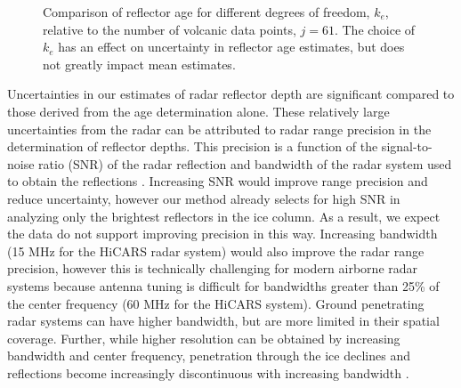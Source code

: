 \begin{figure*}[ht]
\begin{center}
{}
\caption{Comparison of reflector age for different degrees of freedom, $k_e$, relative to the number of volcanic data points, $j=61$. The choice of $k_e$ has an effect on uncertainty in reflector age estimates, but does not greatly impact mean estimates. }
\end{center}
\label{fig:ke}
\end{figure*}


Uncertainties in our estimates of radar reflector depth are significant compared to those derived from the age determination alone. These relatively large uncertainties from the radar can be attributed to radar range precision in the determination of reflector depths. This precision is a function of the signal-to-noise ratio (SNR) of the radar reflection and bandwidth of the radar system used to obtain the reflections \citep{cavitte2016}. Increasing SNR would improve range precision and reduce uncertainty, however our method already selects for high SNR in analyzing only the brightest reflectors in the ice column. As a result, we expect the data do not support improving precision in this way. Increasing bandwidth (15 MHz for the HiCARS radar system) would also improve the radar range precision, however this is technically challenging for modern airborne radar systems because antenna tuning is difficult for bandwidths greater than 25\% of the center frequency (60 MHz for the HiCARS system). Ground penetrating radar systems can have higher bandwidth, but are more limited in their spatial coverage. Further, while higher resolution can be obtained by increasing bandwidth and center frequency, penetration through the ice declines and reflections become increasingly discontinuous with increasing bandwidth \citep{cavitte2016}.






